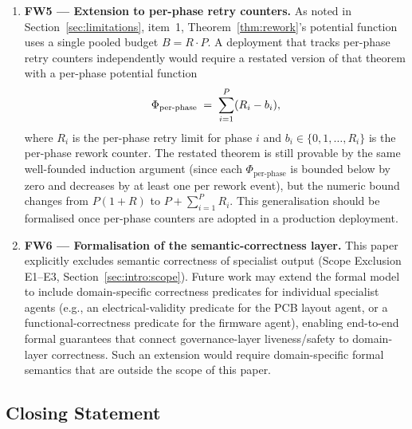 \documentclass[12pt]{article}
\theoremstyle{definition}
\begin{document}
\begin{enumerate}
    \item \textbf{FW5 --- Extension to per-phase retry counters.}
          As noted in Section~\ref{sec:limitations}, item~1,
          Theorem~\ref{thm:rework}'s potential function uses a single
          pooled budget $B = R \cdot P$.  A deployment that tracks
          per-phase retry counters independently would require a
          restated version of that theorem with a per-phase potential
          function
          \begin{align}
              \Phi_{\text{per-phase}}
              \;=\;
              \sum_{i=1}^{P} (R_i - b_i),
              \notag
          \end{align}
          where $R_i$ is the per-phase retry limit for phase $i$ and
          $b_i \in \{0, 1, \ldots, R_i\}$ is the per-phase rework
          counter.  The restated theorem is still provable by the
          same well-founded induction argument (since each $\Phi_{\text{per-phase}}$ is bounded
          below by zero and decreases by at least one per rework
          event), but the numeric bound changes from
          $P(1+R)$ to $P + \sum_{i=1}^{P} R_i$.  This generalisation
          should be formalised once per-phase counters are adopted in
          a production deployment.

    \item \textbf{FW6 --- Formalisation of the semantic-correctness
          layer.}
          This paper explicitly excludes semantic correctness of
          specialist output (Scope Exclusion E1--E3,
          Section~\ref{sec:intro:scope}).  Future work may extend
          the formal model to include domain-specific correctness
          predicates for individual specialist agents
          (e.g., an electrical-validity predicate for the PCB
          layout agent, or a functional-correctness predicate for
          the firmware agent), enabling end-to-end formal guarantees
          that connect governance-layer liveness/safety to
          domain-layer correctness.  Such an extension would require
          domain-specific formal semantics that are outside the
          scope of this paper.

\end{enumerate}

\subsection{Closing Statement}
\label{sec:conclusion:closing}
\end{document}
